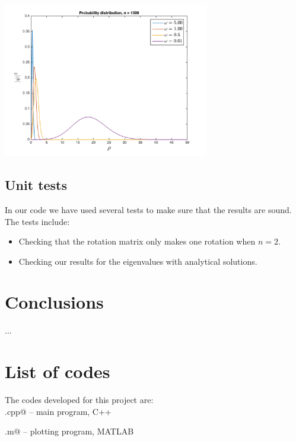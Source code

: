 \documentclass{article}
\begin{document}
\begin{multicols}{2}
\begin{center}
	\includegraphics[width=90mm]{../build-Project2-Desktop_Qt_5_5_0_clang_64bit-Debug/probability_distribution.png} 	
	\label{fig:prob_dist}
\end{center}


\subsection{Unit tests}
In our code we have used several tests to make sure that the results are sound. The tests include:

\begin{itemize}
	\item Checking that the rotation matrix only makes one rotation when $n = 2$.
	\item Checking our results for the eigenvalues with analytical solutions.
\end{itemize}




\section{Conclusions}
...





\section{List of codes}

The codes developed for this project are:\\

\noindent \verb@main.cpp@ -- main program, C++

\noindent \verb@plotting.m@ -- plotting program, MATLAB

\end{multicols}
\end{document}
